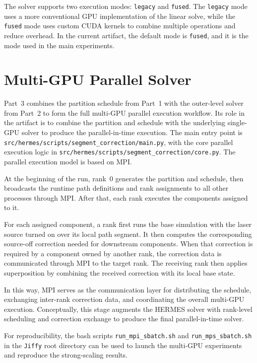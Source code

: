 \documentclass[11pt]{article}
\begin{document}
The solver supports two execution modes: \texttt{legacy} and \texttt{fused}.
The \texttt{legacy} mode uses a more conventional GPU implementation of the
linear solve, while the \texttt{fused} mode uses custom CUDA kernels to combine
multiple operations and reduce overhead. In the current artifact, the default
mode is \texttt{fused}, and it is the mode used in the main experiments.

\section{Multi-GPU Parallel Solver}

Part~3 combines the partition schedule from Part~1 with the outer-level solver
from Part~2 to form the full multi-GPU parallel execution workflow. Its role in
the artifact is to combine the partition and schedule with the underlying
single-GPU solver to produce the parallel-in-time execution. The main entry
point is \texttt{src/hermes/scripts/segment\_correction/main.py}, with the core
parallel execution logic in
\texttt{src/hermes/scripts/segment\_correction/core.py}. The parallel execution
model is based on MPI.

At the beginning of the run, rank~0 generates the partition and schedule, then
broadcasts the runtime path definitions and rank assignments to all other
processes through MPI. After that, each rank executes the components assigned
to it.

For each assigned component, a rank first runs the base simulation with the
laser source turned on over its local path segment. It then computes the
corresponding source-off correction needed for downstream components. When that
correction is required by a component owned by another rank, the correction data
is communicated through MPI to the target rank. The receiving rank then applies
superposition by combining the received correction with its local base state.

In this way, MPI serves as the communication layer for distributing the
schedule, exchanging inter-rank correction data, and coordinating the overall
multi-GPU execution. Conceptually, this stage augments the HERMES solver with
rank-level scheduling and correction exchange to produce the final
parallel-in-time solver.

For reproducibility, the bash scripts \texttt{run\_mpi\_sbatch.sh} and
\texttt{run\_mps\_sbatch.sh} in the \texttt{Jiffy} root directory can be used
to launch the multi-GPU experiments and reproduce the strong-scaling results.
\end{document}
